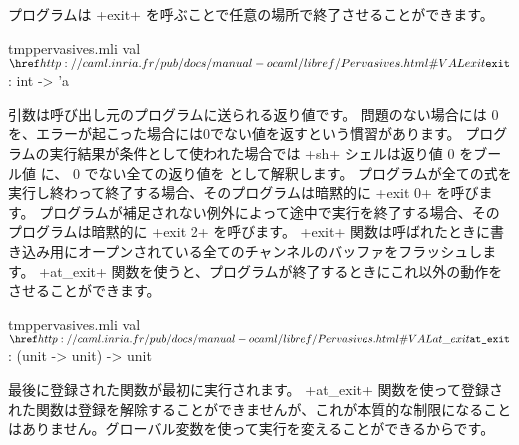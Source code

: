 プログラムは \ml+exit+ を呼ぶことで任意の場所で終了させることができます。
%
\begin{listingcodefile}{tmppervasives.mli}
val $\indexlibvalue{Pervasives}{exit}$ : int -> 'a
\end{listingcodefile}
%
引数は呼び出し元のプログラムに送られる返り値です。
問題のない場合には 0 を、エラーが起こった場合には0でない値を返すという慣習があります。
プログラムの実行結果が条件として使われた場合では \ml+sh+ シェルは返り値 0 をブール値  に、
0 でない全ての返り値を  として解釈します。
%
プログラムが全ての式を実行し終わって終了する場合、そのプログラムは暗黙的に \ml+exit 0+ を呼びます。
プログラムが補足されない例外によって途中で実行を終了する場合、そのプログラムは暗黙的に \ml+exit 2+ を呼びます。
%
\ml+exit+ 関数は呼ばれたときに書き込み用にオープンされている全てのチャンネルのバッファをフラッシュします。
\ml+at_exit+ 関数を使うと、プログラムが終了するときにこれ以外の動作をさせることができます。
%
\begin{listingcodefile}{tmppervasives.mli}
val $\indexlibvalue{Pervasives}{at\_exit}$ : (unit -> unit) -> unit
\end{listingcodefile}
%
最後に登録された関数が最初に実行されます。 \ml+at_exit+ 関数を使って登録された関数は登録を解除することができませんが、これが本質的な制限になることはありません。グローバル変数を使って実行を変えることができるからです。

